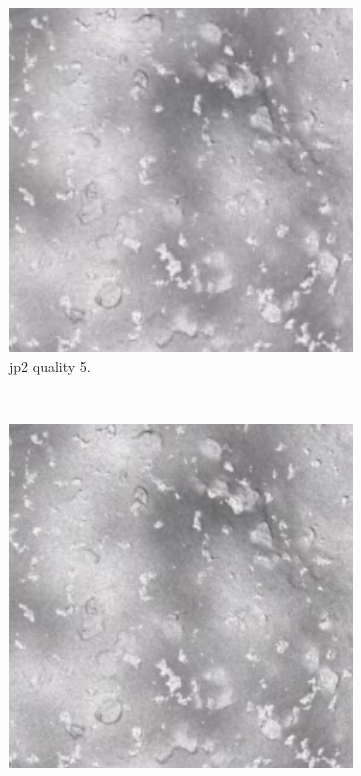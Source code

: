 \begin{figure}[htb]
\begin{subfigure}[b]{0.44\textwidth}
            \includegraphics[width=\textwidth]{doc/thesis/0_figures/compare_quality/set1/jp2_5_center.png}
            \caption{\gls{jp2} quality 5.}
            \label{fig:img_quality_5}
        \end{subfigure}
        \\
        \begin{subfigure}[b]{0.44\textwidth}
            \centering
            \includegraphics[width=\textwidth]{doc/thesis/0_figures/compare_quality/set1/jp2_10_center.png}

\end{subfigure}
\end{figure}
